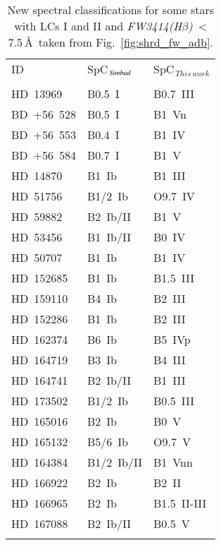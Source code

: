\documentclass{aa}
\newcommand{\fwhb}{\textit{FW3414(H$\beta$)}}
\begin{document}
\begin{appendix}
\begin{table}[h]
\caption{New spectral classifications for some stars with LCs I and II and \fwhb\ < 7.5\,\AA\ taken from Fig.~\ref{fig:shrd_fw_adb}.}
\label{tab:newclass_BSGs}
    \centering
    \begin{tabular}{lll}
        ID & SpC$_{\textit{\,Simbad}}$ & SpC$_{\,This\,work}$ \\
        \noalign{\vspace{0.2cm}}\hline\noalign{\smallskip}
        \multicolumn{3}{c}{Stars wrongly classified as supergiants}\\
        \noalign{\smallskip}\hline\noalign{\smallskip\smallskip}\smallskip
        HD~13969   & B0.5~I & B0.7~III \\\smallskip
        BD~+56~528 & B0.5~I & B1~Vn \\\smallskip
        BD~+56~553 & B0.4~I & B1~IV \\\smallskip
        BD~+56~584 & B0.7~I & B1~V \\\smallskip
        HD~14870   & B1~Ib & B1~III \\\smallskip
        HD~51756   & B1/2~Ib & O9.7~IV \\\smallskip
        HD~59882   & B2~Ib/II & B1~V \\\smallskip
        HD~53456   & B1~Ib/II & B0~IV \\\smallskip
        HD~50707   & B1~Ib & B1~IV \\\smallskip
        HD~152685  & B1~Ib & B1.5~III \\\smallskip
        HD~159110  & B4~Ib & B2~III \\\smallskip
        HD~152286  & B1~Ib & B2~III \\\smallskip
        HD~162374  & B6~Ib & B5~IVp \\\smallskip
        HD~164719  & B3~Ib & B4~III \\\smallskip
        HD~164741  & B2~Ib/II & B1~III \\\smallskip
        HD~173502  & B1/2~Ib & B0.5~III \\\smallskip
        HD~165016  & B2~Ib & B0~V \\\smallskip
        HD~165132  & B5/6~Ib & O9.7~V \\\smallskip
        HD~164384  & B1/2~Ib/II & B1~Vnn \\\smallskip
        HD~166922  & B2~Ib & B2~II \\\smallskip
        HD~166965  & B2~Ib & B1.5~II-III \\\smallskip
        HD~167088  & B2~Ib/II & B0.5~V \\\smallskip

\end{tabular}
\end{table}
\end{appendix}
\end{document}
